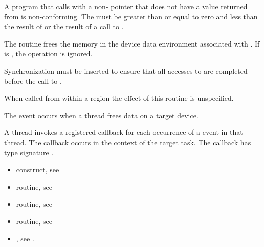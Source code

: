 \begin{ccppspecific}
\constraints

A program that calls  with a non- pointer 
that does not have a value returned from  is
non-conforming.  The  must be greater than or equal to 
zero and less than the result of  or the
 result of a call to .

\effect

The  routine frees the memory in the device data
environment associated with .  If  is
, the operation is ignored.

Synchronization must be inserted to ensure that all accesses to 
 are completed before the call to .

When called from within a  region the effect of this routine
is unspecified.

\events
The  event occurs when a thread frees data on a target device.

\tools

A thread invokes a registered 
callback for each occurrence of a  event in that thread. 
The callback occurs in the context of the target task.  The callback has type signature
. 


\crossreferences
\begin{itemize}
\item {} construct, see 

\item {} routine, see 

\item {} routine, see 

\item {} routine, see 

\item {}, see 
.

\end{itemize}



\subsection{}
\label{subsec:omp_target_is_present}
\summary


\end{ccppspecific}

